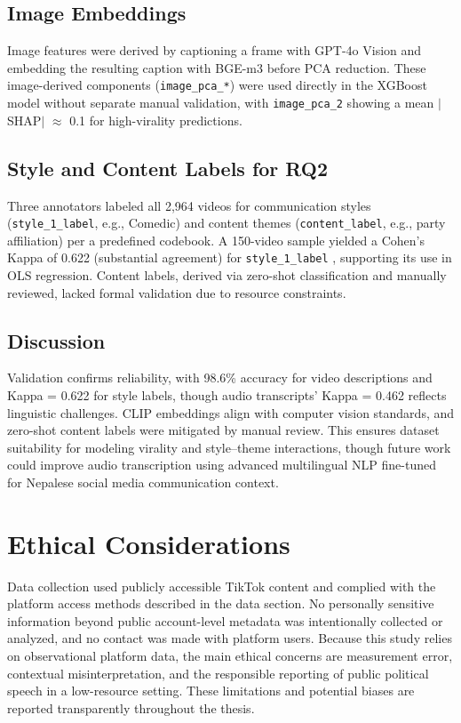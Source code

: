 \documentclass[12pt,a4paper]{report}
\begin{document}
\subsection{Image Embeddings}
Image features were derived by captioning a frame with GPT-4o Vision and embedding the resulting caption with BGE-m3 before PCA reduction. These image-derived components (\texttt{image\_pca\_*}) were used directly in the XGBoost model without separate manual validation, with \texttt{image\_pca\_2} showing a mean $|$SHAP$|$ $\approx$ 0.1 for high-virality predictions.

\subsection{Style and Content Labels for RQ2}
Three annotators labeled all 2,964 videos for communication styles (\texttt{style\_1\_label}, e.g., Comedic) and content themes (\texttt{content\_label}, e.g., party affiliation) per a predefined codebook. A 150-video sample yielded a Cohen’s Kappa of 0.622 (substantial agreement) for \texttt{style\_1\_label} \parencite{landis1977measurement}, supporting its use in OLS regression. Content labels, derived via zero-shot classification and manually reviewed, lacked formal validation due to resource constraints.

\subsection{Discussion}
Validation confirms reliability, with 98.6\% accuracy for video descriptions and Kappa = 0.622 for style labels, though audio transcripts’ Kappa = 0.462 reflects linguistic challenges. CLIP embeddings align with computer vision standards, and zero-shot content labels were mitigated by manual review. This ensures dataset suitability for modeling virality and style–theme interactions, though future work could improve audio transcription using advanced multilingual NLP fine-tuned for Nepalese social media communication context.

\section{Ethical Considerations}
Data collection used publicly accessible TikTok content and complied with the platform access methods described in the data section. No personally sensitive information beyond public account-level metadata was intentionally collected or analyzed, and no contact was made with platform users. Because this study relies on observational platform data, the main ethical concerns are measurement error, contextual misinterpretation, and the responsible reporting of public political speech in a low-resource setting. These limitations and potential biases are reported transparently throughout the thesis.
\end{document}
